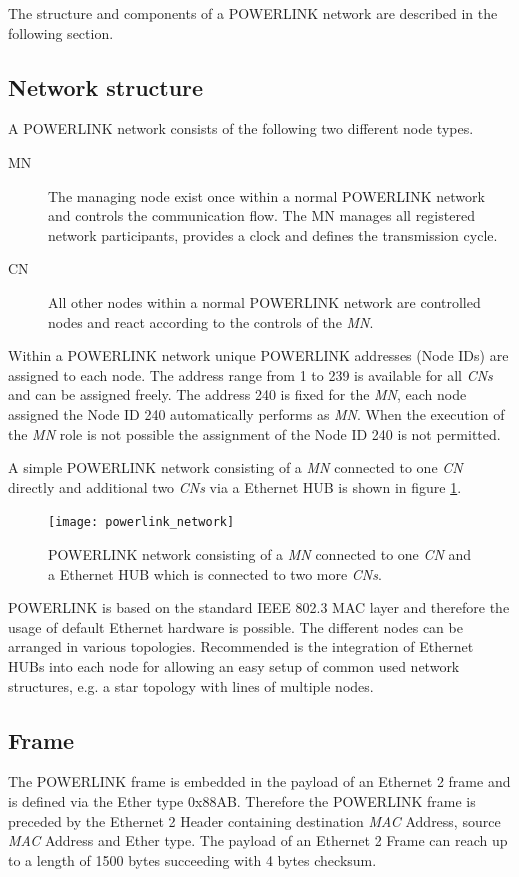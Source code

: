 The structure and components of a POWERLINK network are described in the following section.

\subsection{Network structure}
\label{sec:oplk_powerlink_network}
A POWERLINK network consists of the following two different node types.

\begin{description}
    \item[MN] The managing node exist once within a normal POWERLINK network and controls the communication flow.
    The MN manages all registered network participants, provides a clock and defines the transmission cycle.
    \item[CN] All other nodes within a normal POWERLINK network are controlled nodes and react according to the controls of the \emph{MN}.
\end{description}

Within a POWERLINK network unique POWERLINK addresses (Node IDs) are assigned to each node.
The address range from 1 to 239 is available for all \emph{CNs} and can be assigned freely.
The address 240 is fixed for the \emph{MN}, each node assigned the Node ID 240 automatically performs as \emph{MN}.
When the execution of the \emph{MN} role is not possible the assignment of the Node ID 240 is not permitted.
\cite{epsg_epsg_2013}

A simple POWERLINK network consisting of a \emph{MN} connected to one \emph{CN} directly and additional two \emph{CNs} via a Ethernet HUB is shown in figure \ref{fig:powerlink_network}.

\begin{figure}
    \centering
    \texttt{[image: powerlink\_network]}
    \caption{POWERLINK network consisting of a \emph{MN} connected to one \emph{CN} and a Ethernet HUB which is connected to two more \emph{CNs}.}
    \label{fig:powerlink_network}
\end{figure}

POWERLINK is based on the standard IEEE 802.3 MAC layer and therefore the usage of default Ethernet hardware is possible.
The different nodes can be arranged in various topologies.
Recommended is the integration of Ethernet HUBs into each node for allowing an easy setup of common used network structures, e.g. a star topology with lines of multiple nodes. \cite[chapter 3]{epsg_epsg_2013}

\subsection{Frame}
\label{sec:oplk_powerlink_frame}
The POWERLINK frame is embedded in the payload of an Ethernet 2 frame and is defined via the Ether type 0x88AB.
Therefore the POWERLINK frame is preceded by the Ethernet 2 Header containing destination \emph{MAC} Address, source \emph{MAC} Address and Ether type.
The payload of an Ethernet 2 Frame can reach up to a length of 1500 bytes succeeding with 4 bytes checksum. \cite[section 3.2]{ethernet_ieee_2016} \cite[section 4.6.1]{epsg_epsg_2013}

